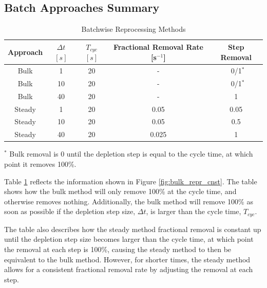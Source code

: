 \subsection{Batch Approaches Summary}

\begin{table}[H]
\renewcommand{\arraystretch}{1.25}
\caption{Batchwise Reprocessing Methods}
\label{tab:batch_methods}
\begin{center}
\begin{tabular}{ | c | c | c | c | c | }
 \hline
        Approach & $\Delta t$ $[s]$ & $T_{cyc}$ $[s]$ & Fractional Removal Rate [s$^{-1}$] & Step Removal\\
 \hline
 \hline
        Bulk & 1 & 20 & - & \, 0/1$^{*}$\\
        Bulk & 10 & 20 & - & \, 0/1$^{*}$ \\
        Bulk & 40 & 20 & - & 1 \\
        Steady & 1 & 20 & 0.05 & 0.05\\
        Steady & 10 & 20 & 0.05 & 0.5\\
        Steady & 40 & 20 & 0.025 & 1\\
 \hline
\end{tabular}
\end{center}
\end{table}
        \begin{center}
\footnotesize{$^{*}$ Bulk removal is 0 until the depletion step is equal to the cycle time, at which point it removes 100\%.}\\
        \end{center}
        
Table \ref{tab:batch_methods} reflects the information shown in Figure \ref{fig:bulk_repr_cnst}. The table shows how the bulk method will only remove 100\% at the cycle time, and otherwise removes nothing. Additionally, the bulk method will remove 100\% as soon as possible if the depletion step size, $\Delta t$, is larger than the cycle time, $T_{cyc}$. 

The table also describes how the steady method fractional removal is constant up until the depletion step size becomes larger than the cycle time, at which point the removal at each step is 100\%, causing the steady method to then be equivalent to the bulk method. However, for shorter times, the steady method allows for a consistent fractional removal rate by adjusting the removal at each step.


